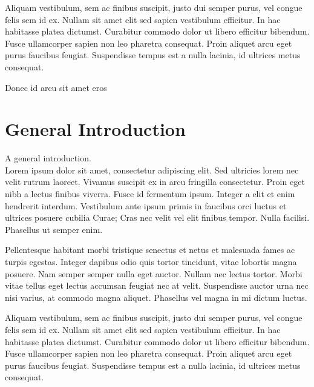 \documentclass[12pt,a4paper,oneside]{report}
\begin{document}
Aliquam vestibulum, sem ac finibus suscipit, justo dui semper purus, vel congue felis sem id ex. Nullam sit amet elit sed sapien vestibulum efficitur. In hac habitasse platea dictumst. Curabitur commodo dolor ut libero efficitur bibendum. Fusce ullamcorper sapien non leo pharetra consequat. Proin aliquet arcu eget purus faucibus feugiat. Suspendisse tempus est a nulla lacinia, id ultrices metus consequat.

Donec id arcu sit amet eros 

\newpage

\tableofcontents

\newpage
\setcounter{page}{0}

\chapter*{General Introduction}

A general introduction.\\
Lorem ipsum dolor sit amet, consectetur adipiscing elit. Sed ultricies lorem nec velit rutrum laoreet. Vivamus suscipit ex in arcu fringilla consectetur. Proin eget nibh a lectus finibus viverra. Fusce id fermentum ipsum. Integer a elit et enim hendrerit interdum. Vestibulum ante ipsum primis in faucibus orci luctus et ultrices posuere cubilia Curae; Cras nec velit vel elit finibus tempor. Nulla facilisi. Phasellus ut semper enim.

Pellentesque habitant morbi tristique senectus et netus et malesuada fames ac turpis egestas. Integer dapibus odio quis tortor tincidunt, vitae lobortis magna posuere. Nam semper semper nulla eget auctor. Nullam nec lectus tortor. Morbi vitae tellus eget lectus accumsan feugiat nec at velit. Suspendisse auctor urna nec nisi varius, at commodo magna aliquet. Phasellus vel magna in mi dictum luctus.

Aliquam vestibulum, sem ac finibus suscipit, justo dui semper purus, vel congue felis sem id ex. Nullam sit amet elit sed sapien vestibulum efficitur. In hac habitasse platea dictumst. Curabitur commodo dolor ut libero efficitur bibendum. Fusce ullamcorper sapien non leo pharetra consequat. Proin aliquet arcu eget purus faucibus feugiat. Suspendisse tempus est a nulla lacinia, id ultrices metus consequat.
\end{document}
